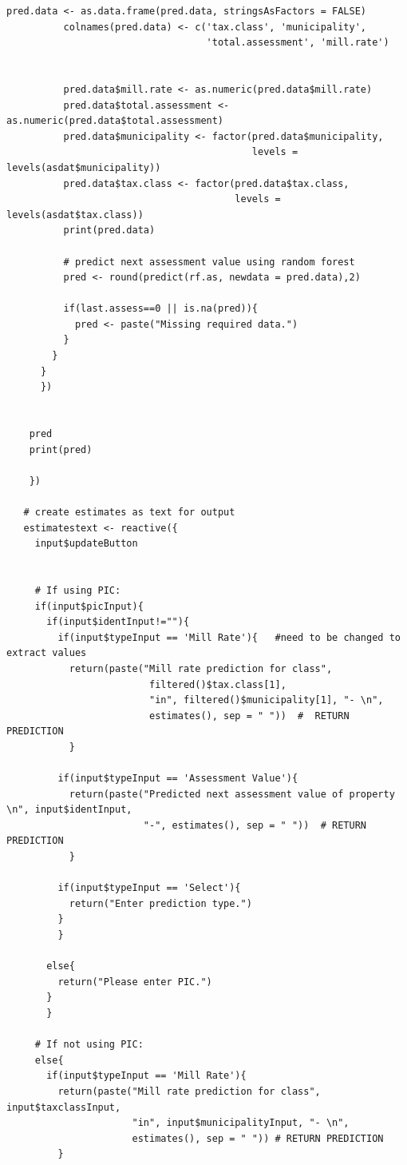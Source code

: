 \documentclass{article}
\begin{document}
\begin{lstlisting}[style=R, caption={Code used for the Shiny app.}, captionpos=b]
          pred.data <- as.data.frame(pred.data, stringsAsFactors = FALSE)
          colnames(pred.data) <- c('tax.class', 'municipality',
                                   'total.assessment', 'mill.rate')
            
          
          pred.data$mill.rate <- as.numeric(pred.data$mill.rate)
          pred.data$total.assessment <- as.numeric(pred.data$total.assessment)
          pred.data$municipality <- factor(pred.data$municipality,
                                           levels = levels(asdat$municipality))
          pred.data$tax.class <- factor(pred.data$tax.class,
                                        levels = levels(asdat$tax.class))
          print(pred.data)
          
          # predict next assessment value using random forest
          pred <- round(predict(rf.as, newdata = pred.data),2)
          
          if(last.assess==0 || is.na(pred)){
            pred <- paste("Missing required data.")
          }
        }
      }
      })
    
    
    pred
    print(pred)
    
    })
   
   # create estimates as text for output
   estimatestext <- reactive({
     input$updateButton
    
      
     # If using PIC:
     if(input$picInput){
       if(input$identInput!=""){
         if(input$typeInput == 'Mill Rate'){   #need to be changed to extract values
           return(paste("Mill rate prediction for class", 
                         filtered()$tax.class[1],
                         "in", filtered()$municipality[1], "- \n", 
                         estimates(), sep = " "))  #  RETURN PREDICTION
           }
       
         if(input$typeInput == 'Assessment Value'){
           return(paste("Predicted next assessment value of property \n", input$identInput,
                        "-", estimates(), sep = " "))  # RETURN PREDICTION
           }
          
         if(input$typeInput == 'Select'){
           return("Enter prediction type.")
         }
         }
     
       else{
         return("Please enter PIC.")
       }
       }
    
     # If not using PIC:
     else{
       if(input$typeInput == 'Mill Rate'){
         return(paste("Mill rate prediction for class", input$taxclassInput,
                      "in", input$municipalityInput, "- \n", 
                      estimates(), sep = " ")) # RETURN PREDICTION
         }
      

\end{lstlisting}
\end{document}
